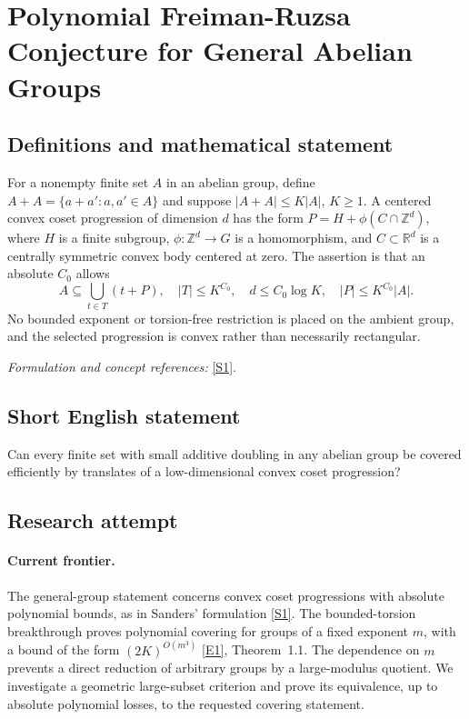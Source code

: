 \documentclass[11pt,a4paper]{article}
\newcommand{\Z}{\mathbb{Z}}
\newcommand{\R}{\mathbb{R}}
\newcommand{\sref}[2]{\hyperlink{source:#1:#2}{[S#2]}}
\newcommand{\eref}[2]{\hyperlink{extra:#1:#2}{[E#2]}}
\newif\ifshowcatalogue
\newcommand{\cataloguescope}[1]{\ifshowcatalogue
 \paragraph{Exact scope in the supplied catalogue.}
 \begin{quote}\small #1\end{quote}\fi}
\numberwithin{equation}{section}
\begin{document}
\setcounter{section}{0}
\clearpage
\section*{\texorpdfstring{Polynomial Freiman-Ruzsa Conjecture for General Abelian Groups}{Polynomial Freiman-Ruzsa Conjecture for General Abelian Groups}}\label{30006785}
\subsection{Definitions and mathematical statement}
For a nonempty finite set $A$ in an abelian group, define $A+A=\{a+a':a,a'\in A\}$ and suppose $|A+A|\le K|A|$, $K\ge1$. A centered convex coset progression of dimension $d$ has the form
$P=H+\phi(C\cap\Z^d)$, where $H$ is a finite subgroup, $\phi:\Z^d\to G$ is a homomorphism, and $C\subset\R^d$ is a centrally symmetric convex body centered at zero. The assertion is that an absolute $C_0$ allows
\[
 A\subseteq\bigcup_{t\in T}(t+P),\quad |T|\le K^{C_0},
 \quad d\le C_0\log K,\quad |P|\le K^{C_0}|A|.
\]
No bounded exponent or torsion-free restriction is placed on the ambient group, and the selected progression is convex rather than necessarily rectangular.
\par\smallskip\textit{Formulation and concept references:} \sref{30006785}{1}.
\cataloguescope{Prove that there is an absolute constant C such that for every finite subset A of an arbitrary abelian group with |A+A| <= K|A|, the set A can be covered by exp(C log K) translates of a centred convex coset progression of dimension at most C log K and size at most exp(C log K)|A|.}
\subsection{Short English statement}
Can every finite set with small additive doubling in any abelian group be covered efficiently by translates of a low-dimensional convex coset progression?
\subsection{Research attempt}

\paragraph{Current frontier.}
The general-group statement concerns convex coset progressions with absolute polynomial bounds, as in Sanders' formulation \sref{30006785}{1}. The bounded-torsion breakthrough proves polynomial covering for groups of a fixed exponent $m$, with a bound of the form $(2K)^{O(m^3)}$ \eref{30006785}{1}, Theorem~1.1. The dependence on $m$ prevents a direct reduction of arbitrary groups by a large-modulus quotient. We investigate a geometric large-subset criterion and prove its equivalence, up to absolute polynomial losses, to the requested covering statement.
\end{document}
